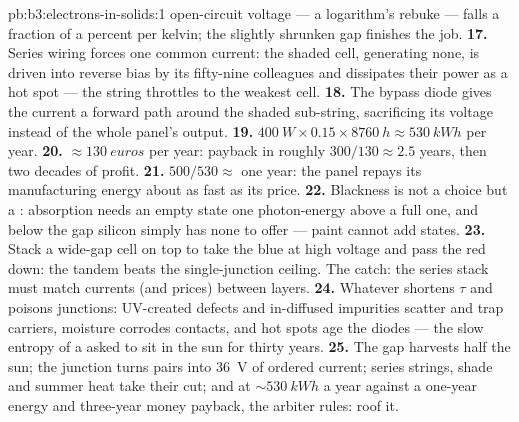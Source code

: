\begin{solution}{pb:b3:electrons-in-solids:1}
open-circuit voltage --- a logarithm's rebuke --- falls a
fraction of a percent per kelvin; the slightly shrunken gap
finishes the job.
\textbf{17.} Series wiring forces one common current: the shaded
cell, generating none, is driven into reverse bias by its
fifty-nine colleagues and dissipates their power as a hot spot
--- the string throttles to the weakest cell.
\textbf{18.} The bypass diode gives the current a forward path
around the shaded sub-string, sacrificing its voltage instead of
the whole panel's output.
\textbf{19.} $\qty{400}{W}\times0.15\times\qty{8760}{h} \approx
\qty{530}{kWh}$ per year.
\textbf{20.} $\approx\qty{130}{euros}$ per year: payback in
roughly $300/130 \approx 2.5$ years, then two decades of profit.
\textbf{21.} $500/530 \approx$ one year: the panel repays its
manufacturing energy about as fast as its price.
\textbf{22.} Blackness is not a choice but a :
absorption needs an empty state one photon-energy above a full
one, and below the gap silicon simply has none to offer ---
paint cannot add states.
\textbf{23.} Stack a wide-gap cell on top to take the blue at
high voltage and pass the red down: the tandem beats the
single-junction ceiling. The catch: the series stack must match
currents (and prices) between layers.
\textbf{24.} Whatever shortens $\tau$ and poisons junctions:
UV-created defects and in-diffused impurities scatter and trap
carriers, moisture corrodes contacts, and hot spots age the
diodes --- the slow entropy of a  asked to sit in the sun
for thirty years.
\textbf{25.} The gap harvests half the sun; the junction turns
pairs into \qty{36}{V} of ordered current; series strings,
shade and summer heat take their cut; and at
$\sim\qty{530}{kWh}$ a year against a one-year energy and
three-year money payback, the arbiter rules: roof it.
\end{solution}
